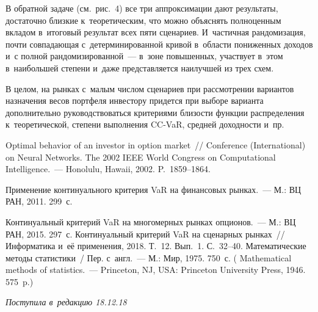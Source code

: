 \begin{multicols}{2}
  В обратной задаче (см.\ рис.~4) все три аппроксимации дают результаты, 
достаточно близкие к~тео\-ре\-ти\-че\-ским, что можно объяснять полноценным 
вкладом в~итоговый результат всех пяти сценариев. И~частичная 
рандомизация, почти совпадающая с~детерминированной кривой в~области 
пониженных доходов и~с полной рандомизированной~--- в~зоне повышенных, 
участвует в~этом в~наибольшей степени и~даже представляется наилучшей из 
трех схем. 
  
  В целом, на рынках с~малым числом сценариев при рассмотрении вариантов 
назначения весов портфеля инвестору придется при выборе варианта 
дополнительно руководствоваться критериями близости функции 
распределения к~теоретической, степени выполнения CC-VaR, средней 
доходности и~пр. 
  
{\small\frenchspacing
 {%
 \begin{thebibliography}{9}
   Optimal behavior of an investor in option market~// 
  Conference (International) on Neural Networks. The 2002 IEEE World Congress on Computational 
Intelligence.~--- Honolulu, Hawaii, 2002. P.~1859--1864.
{

} 
   Применение континуального критерия VaR на финансовых  
рынках.~--- М.: ВЦ РАН, 2011. 299~с. 



   Континуальный критерий VaR на многомерных рынках  
опционов.~--- М.: ВЦ РАН, 2015. 297~с. 
   Континуальный критерий VaR на сценарных рынках~// 
Информатика и~её применения, 2018. Т.~12. Вып.~1. С.~32--40. 
   Математические методы статистики~/ Пер. с~англ.~--- М.: Мир, 1975. 
750~с. ( Mathematical methods of statistics.~--- Princeton, NJ, USA: Princeton 
University Press, 1946. 575~p.)
 \end{thebibliography}

 }
 }

\end{multicols}

\vspace*{-9pt}

\hfill{\small\textit{Поступила в~редакцию 18.12.18}}

\vspace*{6pt}


